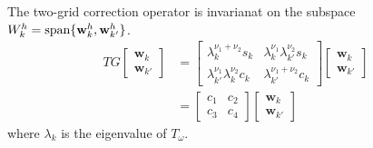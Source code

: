 \begin{thm}
  The two-grid correction operator is invarianat on the subspace
  $W^h_k=\textmd{span}\{\mathbf{w}^h_{k},\mathbf{w}^h_{k'}\} $.
  \begin{equation}
    \begin{aligned}
      TG
      \begin{bmatrix}
        \mathbf{w}_k\\
        \mathbf{w}_{k'}
      \end{bmatrix}
      &=
      \begin{bmatrix}
        \lambda_k^{\nu_1+\nu_2}s_k&\lambda_k^{\nu_1}\lambda_{k'}^{\nu_2}s_k\\
        \lambda_{k'}^{\nu_1}\lambda_{k}^{\nu_2}c_k&\lambda_{k'}^{\nu_1+\nu_2}c_k
      \end{bmatrix}
      \begin{bmatrix}
        \mathbf{w}_k\\
        \mathbf{w}_{k'}
      \end{bmatrix}\\
      &=
      \begin{bmatrix}
        c_1 & c_2\\
        c_3& c_4
      \end{bmatrix}
      \begin{bmatrix}
        \mathbf{w}_k\\
        \mathbf{w}_{k'}
      \end{bmatrix}
    \end{aligned}
  \end{equation}
  where $\lambda_k$ is the eigenvalue of $T_{\omega}$.
\end{thm}

